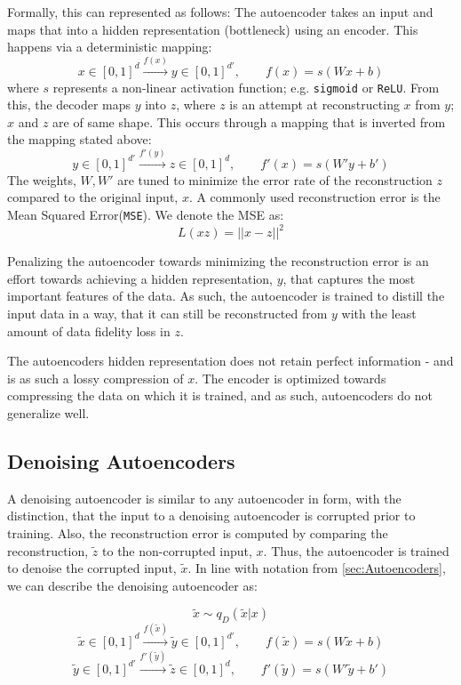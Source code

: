 Formally, this can represented as follows: The autoencoder takes an input and maps that into a hidden representation (bottleneck) using an encoder. This happens via a deterministic mapping: 
$$
x\in[0,1]^{d} \xrightarrow{\text{$f(x)$}} y\in[0,1]^{d'}, \quad \quad f(x) = s(Wx + b)
$$
where $s$ represents a non-linear activation function; e.g. \texttt{sigmoid} or \texttt{ReLU}. 
From this, the decoder maps $y$ into $z$, where $z$ is an attempt at reconstructing $x$ from $y$; $x$ and $z$ are of same shape. This occurs through a mapping that is inverted from the mapping stated above:
$$
y\in[0,1]^{d'} \xrightarrow{\text{$f'(y)$}} z\in[0,1]^{d}, \quad \quad f'(x) = s(W'y + b')
$$
The weights, $W, W'$ are tuned to minimize the error rate of the reconstruction $z$ compared to the original input, $x$. A commonly used reconstruction error is the Mean Squared Error(\texttt{MSE}).
We denote the MSE as:
$$
L(xz) = ||x-z||^{2}
$$

Penalizing the autoencoder towards minimizing the reconstruction error is an effort towards achieving a hidden representation, $y$, that captures the most important features of the data.
As such, the autoencoder is trained to distill the input data in a way, that it can still be reconstructed from $y$ with the least amount of data fidelity loss in $z$.

The autoencoders hidden representation does not retain perfect information - and is as such a lossy compression of $x$. 
The encoder is optimized towards compressing the data on which it is trained, and as such, autoencoders do not generalize well. 

\subsection{Denoising Autoencoders}
A denoising autoencoder is similar to any autoencoder in form, with the distinction, that the input to a denoising autoencoder is corrupted prior to training.
Also, the reconstruction error is computed by comparing the reconstruction, $\widetilde{z}$ to the non-corrupted input, $x$. 
Thus, the autoencoder is trained to denoise the corrupted input, $\widetilde{x}$. In line with notation from \autoref{sec:Autoencoders}, we can describe the denoising autoencoder as:

$$
\widetilde{x} \sim q_{D}(\widetilde{x}|x) 
$$
$$
\widetilde{x}\in[0,1]^{d} \xrightarrow{\text{$f(\widetilde{x})$}} \widetilde{y}\in[0,1]^{d'}, \quad \quad f(\widetilde{x}) = s(W\widetilde{x} + b)
$$
$$
\widetilde{y}\in[0,1]^{d'} \xrightarrow{\text{$f'(\widetilde{y})$}} \widetilde{z}\in[0,1]^{d}, \quad \quad f'(\widetilde{y}) = s(W'\widetilde{y} + b')
$$

